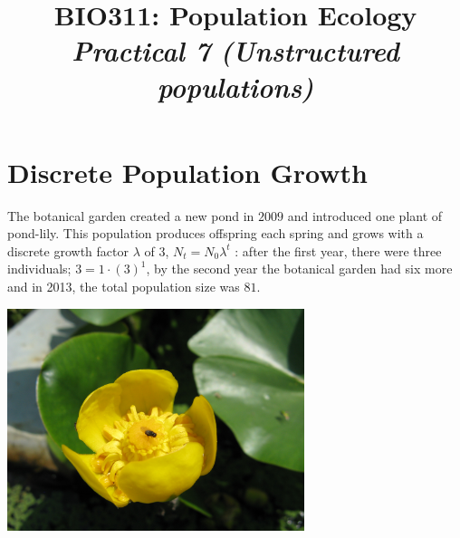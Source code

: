 \documentclass{article}\usepackage[]{graphicx}\usepackage[]{color}
\title{BIO311: Population Ecology\\ \textit{Practical 7 (Unstructured populations)}}
\begin{document}

\maketitle
\tableofcontents


\newpage


\section{Discrete Population Growth}
The botanical garden created a new pond in $2009$ and introduced one plant of pond-lily. This population produces offspring each spring and grows with a discrete growth factor $\lambda$ of $3$, $N_t=N_0\lambda ^t$ : after the first year, there were three individuals; $3=1 \cdot (3)^1$, by the second year the botanical garden had six more and in 2013, the total population size was $81$.

\vspace{1.5ex}

\begin{center}
\includegraphics[width=0.65\textwidth]{Nuphar_pumilum2.jpg}
\end{center}
\vspace{1.5ex}
\end{document}
